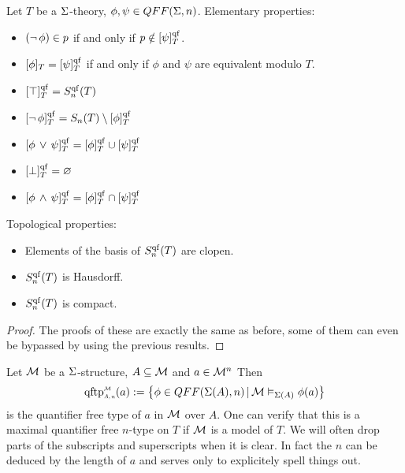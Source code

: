 \begin{prop}
    Let $T$ be a $\Sigma$-theory, $\phi, \psi \in QFF(\Sigma,n)$.
    Elementary properties:
    \begin{itemize}
        \item $(\neg\, \phi) \in p$ if and only if $p \notin [\psi]_T^{\operatorname{qf}}$.
        \item $[\phi]_T = [\psi]_T^{\operatorname{qf}}$ if and only if $\phi$ and $\psi$ are 
            equivalent modulo $T$.
        \item $[\top]_T^{\operatorname{qf}} = S_n^{\operatorname{qf}}(T)$
        \item $[\neg\, \phi]_T^{\operatorname{qf}} = S_n(T) \setminus [\phi]_T^{\operatorname{qf}}$
        \item $[\phi \, \lor \, \psi]_T^{\operatorname{qf}} = [\phi]_T^{\operatorname{qf}} \cup [\psi]_T^{\operatorname{qf}}$
        \item $[\bot]_T^{\operatorname{qf}} = \varnothing$
        \item $[\phi \, \land \, \psi]_T^{\operatorname{qf}} = [\phi]_T^{\operatorname{qf}} \cap [\psi]_T^{\operatorname{qf}}$
    \end{itemize}
    Topological properties:
    \begin{itemize}
        \item Elements of the basis of $S_n^{\operatorname{qf}}(T)$ are clopen.
        \item $S_n^{\operatorname{qf}}(T)$ is Hausdorff.
        \item $S_n^{\operatorname{qf}}(T)$ is compact.
    \end{itemize}
\end{prop}
\begin{proof}
    The proofs of these are exactly the same as before, 
    some of them can even be bypassed by using the previous results.
\end{proof}

\begin{dfn}
    Let $\mathcal{M}$ be a $\Sigma$-structure, 
    $A \subseteq {\mathcal{M}}$ and $a \in {\mathcal{M}}^n$
    Then 
    \[\subintp{A,n}{\MM}{\qftp}(a) := 
    \set{\phi \in QFF(\Si(A),n) \st \MM \model{\Si(A)} \phi(a)}\]
    is the quantifier free type of $a$ in $\mathcal{M}$ over $A$.
    One can verify that this is a maximal quantifier free $n$-type on $T$
    if $\mathcal{M}$ is a model of $T$.
    We will often drop parts of the subscripts and superscripts when it is
    clear. 
    In fact the $n$ can be deduced by the length of $a$ 
    and serves only to explicitely spell things out.
\end{dfn}